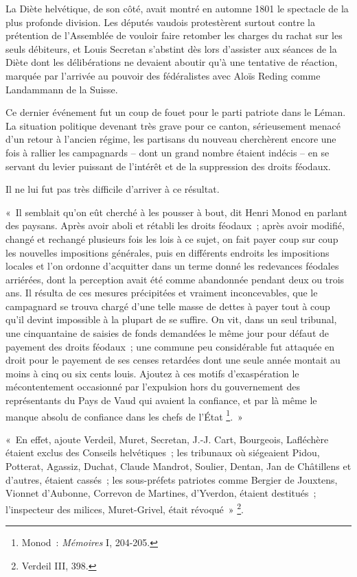\documentclass[french,twoside]{book} %
\newenvironment{quoteblock}%
  {\begin{quoting}}
  {\end{quoting}}
\newenvironment{quotebar}{%
    \def\FrameCommand{{\color{rubric!10!}\vrule width 0.5em} \hspace{0.9em}}%
    \def\OuterFrameSep{\itemsep} %
    \MakeFramed {\advance\hsize-\width \FrameRestore}
  }%
  {%
    \endMakeFramed
  }
\renewenvironment{quoteblock}%
  {%
    \savenotes
    \setstretch{0.9}
    \normalfont
    \begin{quotebar}
  }
  {%
    \end{quotebar}
    \spewnotes
  }
\begin{document}
\noindent La Diète helvétique, de son côté, avait montré en automne 1801 le spectacle de la plus profonde division. Les députés vaudois protestèrent surtout contre la prétention de l’Assemblée de vouloir faire retomber les charges du rachat sur les seuls débiteurs, et Louis Secretan s’abstint dès lors d’assister aux séances de la Diète dont les délibérations ne devaient aboutir qu’à une tentative de réaction, marquée par l’arrivée au pouvoir des fédéralistes avec Aloïs Reding comme Landammann de la Suisse.\par
Ce dernier événement fut un coup de fouet pour le parti patriote dans le Léman. La situation politique devenant très grave pour ce canton, sérieusement menacé d’un retour à l’ancien régime, les partisans du nouveau cherchèrent encore une fois à rallier les campagnards – dont un grand nombre étaient indécis – en se servant du levier puissant de l’intérêt et de la suppression des droits féodaux.\par
Il ne lui fut pas très difficile d’arriver à ce résultat.\par

\begin{quoteblock}
 \noindent « Il semblait qu’on eût cherché à les pousser à bout, dit Henri Monod en parlant des paysans. Après avoir aboli et rétabli les droits féodaux ; après avoir modifié, changé et rechangé plusieurs fois les lois à ce sujet, on fait payer coup sur coup les nouvelles impositions générales, puis en différents endroits les impositions locales et l’on ordonne d’acquitter dans un terme donné les redevances féodales arriérées, dont la perception avait été comme abandonnée pendant deux ou trois ans. Il résulta de ces mesures précipitées et vraiment inconcevables, que le campagnard se trouva chargé d’une telle masse de dettes à payer tout à coup qu’il devint impossible à la plupart de se suffire. On vit, dans un seul tribunal, une cinquantaine de saisies de fonds demandées le même jour pour défaut de payement des droits féodaux ; une commune peu considérable fut attaquée en droit pour le payement de ses censes retardées dont une seule année montait au moins à cinq ou six cents louis. Ajoutez à ces motifs d’exaspération le mécontentement occasionné par l’expulsion hors du gouvernement des représentants du Pays de Vaud qui avaient la confiance, et par là même le manque absolu de confiance dans les chefs de l’État \footnote{Monod : \emph{Mémoires} I, 204-205.}. »
 \end{quoteblock}


\begin{quoteblock}
 \noindent « En effet, ajoute Verdeil, Muret, Secretan, J.-J. Cart, Bourgeois, Lafléchère étaient exclus des Conseils helvétiques ; les tribunaux où siégeaient Pidou, Potterat, Agassiz, Duchat, Claude Mandrot, Soulier, Dentan, Jan de Châtillens et d’autres, étaient cassés ; les sous-préfets patriotes comme Bergier de Jouxtens, Vionnet d’Aubonne, Correvon de Martines, d’Yverdon, étaient destitués ; l’inspecteur des milices, Muret-Grivel, était révoqué » \footnote{Verdeil III, 398.}.
 \end{quoteblock}
\end{document}

